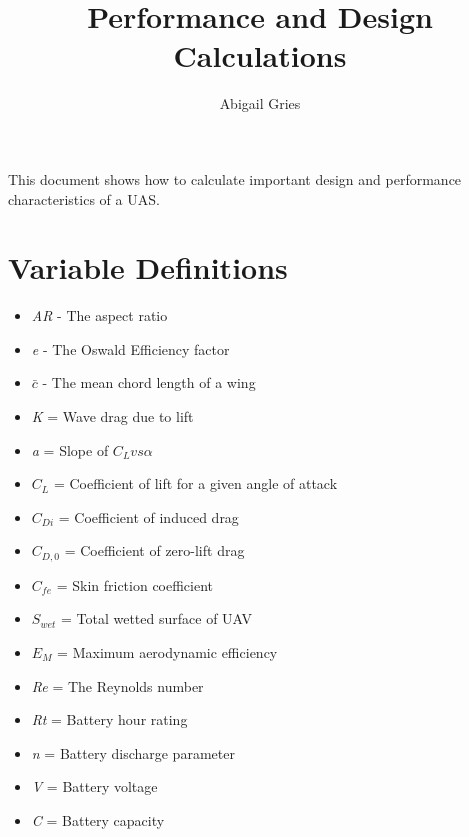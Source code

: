 \documentclass{article}
\begin{document}
\renewcommand*\contentsname{Table of Contents}

\newcommand{\sectionbreak}{\clearpage}

\title{\textbf{Performance and Design Calculations}}
\author{Abigail Gries}
\maketitle

This document shows how to calculate important design and performance characteristics of a UAS. 

\newpage

\tableofcontents

\newpage

\section{Variable Definitions}

\begin{itemize}
\item \textit{AR} - The aspect ratio \\
\item \textit{e} - The Oswald Efficiency factor\\
\item $\bar{c}$ - The mean chord length of a wing\\
\item \textit{K} = Wave drag due to lift \\
\item \textit{a} = Slope of $C_L vs \alpha$ \\
\item $C_L$ = Coefficient of lift for a given angle of attack \\
\item $C_{Di}$ = Coefficient of induced drag\\
\item ${C_{D,0}}$ = Coefficient of zero-lift drag\\
\item $C_{fe}$ = Skin friction coefficient\\
\item $S_{wet}$ = Total wetted surface of UAV\\
\item $E_M$ = Maximum aerodynamic efficiency \\
\item \textit{Re} = The Reynolds number\\
\item \textit{Rt} = Battery hour rating\\
\item \textit{n} = Battery discharge parameter\\
\item \textit{V} = Battery voltage\\
\item \textit{C} = Battery capacity\\
\end{itemize}
\end{document}
